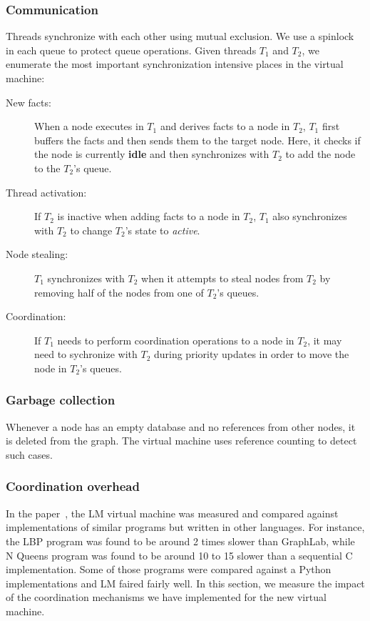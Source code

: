 \subsubsection{Communication}

Threads synchronize with each other using mutual exclusion. We use a spinlock in
each queue to protect queue operations.
Given threads $T_1$ and $T_2$, we enumerate the most important
synchronization intensive places in the virtual machine:

\begin{description}
   \item[New facts:] When a node executes in $T_1$ and derives facts
   to a node in $T_2$, $T_1$ first buffers the facts 
   and then sends them to the target node. Here, it checks if the
   node is currently \textbf{idle} and then synchronizes with $T_2$ to add the
   node to the $T_2$'s queue.
   \item[Thread activation:] If $T_2$ is inactive when adding facts to a node in
   $T_2$, $T_1$ also synchronizes with $T_2$ to change $T_2$'s state to \emph{active}.
   \item[Node stealing:] $T_1$ synchronizes with $T_2$ when it attempts to steal
   nodes from $T_2$ by removing half of the nodes from one of $T_2$'s queues.
   \item[Coordination:] If $T_1$ needs to perform coordination operations
   to a node in $T_2$, it may need to sychronize with $T_2$ during priority
   updates in order to move the node in $T_2$'s queues.
\end{description}

\subsubsection{Garbage collection}

Whenever a node has an empty database and no references from other nodes, it is
deleted from the graph. The virtual machine uses reference counting to detect
such cases.

\subsubsection{Coordination overhead}

In the paper~\cite{cruz-ppdp14}, the LM virtual machine was measured and
compared against implementations of similar programs but written in other
languages. For instance, the LBP program was found to be around 2 times slower
than GraphLab, while N Queens program was found to be around 10 to 15 slower
than a sequential C implementation. Some of those programs were compared against
a Python implementations and LM faired fairly well. In this section, we measure
the impact of the coordination mechanisms we have implemented for the new
virtual machine.

